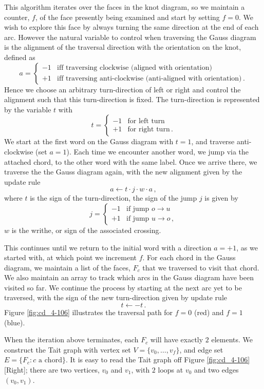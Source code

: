 \documentclass[12pt]{report}
\begin{document}
	This algorithm iterates over the faces in the knot diagram, so we maintain a counter, $f$, of the face presently being examined and start by setting $f = 0$. We wish to explore this face by always turning the same direction at the end of each arc. However the natural variable to control when traversing the Gauss diagram is the alignment of the traversal direction with the orientation on the knot, defined as
	\[a = \begin{cases}
		-1 & \text{iff traversing clockwise (aligned with orientation)} \\
		+1 & \text{iff traversing anti-clockwise (anti-aligned with orientation)}\,.
	\end{cases}\] Hence we choose an arbitrary  turn-direction of left or right and control the alignment such that this turn-direction is fixed. The turn-direction is represented by the variable $t$ with
	\[t = \begin{cases}
		-1	& \text{for left turn}\\
		+1	& \text{for right turn} \,.
	\end{cases}\]
	We start at the first word on the Gauss diagram with $t = 1$, and traverse anti-clockwise (set $a = 1$). Each time we encounter another word, we jump via the attached chord, to the other word with the same label. Once we arrive there, we traverse the the Gauss diagram again, with the new alignment given by the update rule
	\[a \leftarrow t \cdot j \cdot w \cdot a\,,\]
	where $t$ is the sign of the turn-direction, the sign of the jump $j$ is given by
	\[j = \begin{cases}
		-1	& \text{if jump $o \to u$}\\
		+1	& \text{if jump $u \to o$}\,,
	\end{cases}\]
	$w$ is the writhe, or sign of the associated crossing.
	
	This continues until we return to the initial word with a direction $a = +1$, as we started with, at which point we increment $f$. For each chord in the Gauss diagram, we maintain a list of the faces, $F_{c}$ that we traversed to visit that chord. We also maintain an array to track which arcs in the Gauss diagram have been visited so far. We continue the process by starting at the next arc yet to be traversed, with the sign of the new turn-direction given by update rule
	\[t \leftarrow -t\,.\]
	Figure \ref{fig:cd_4-106} illustrates the traversal path for $f = 0$ (red) and $f = 1$ (blue).
	
	When the iteration above terminates, each $F_{c}$ will have exactly $2$ elements. We construct the Tait graph with vertex set $V = \{v_{0}, \dots, v_{f}\}$, and edge set $E = \{F_{c} : \text{$c$ a chord}\}$. It is easy to read the Tait graph off Figure \ref{fig:cd_4-106} [Right]; there are two vertices, $v_{0}$ and $v_{1}$, with $2$ loops at $v_{0}$ and two edges $(v_{0}, v_{1})$. 
	
\end{document}
